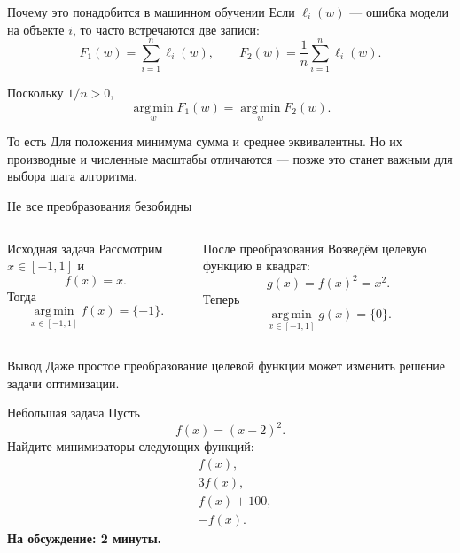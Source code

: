 \documentclass[aspectratio=169,10pt]{beamer}
\newcommand{\argmin}{\operatorname*{arg\,min}}
\newcommand{\loss}{\ell}
\begin{document}
\begin{frame}{Почему это понадобится в машинном обучении}
Если $\loss_i(w)$ --- ошибка модели на объекте $i$, то часто встречаются две записи:
\[
  F_1(w)=\sum_{i=1}^{n}\loss_i(w),
  \qquad
  F_2(w)=\frac{1}{n}\sum_{i=1}^{n}\loss_i(w).
\]

Поскольку $1/n>0$,
\[
  \boxed{\argmin_w F_1(w)=\argmin_w F_2(w).}
\]

\begin{block}{То есть}
Для положения минимума сумма и среднее эквивалентны. Но их производные и численные масштабы отличаются --- позже это станет важным для выбора шага алгоритма.
\end{block}
\end{frame}

\begin{frame}{Не все преобразования безобидны}
\vspace{0.45em}

\begin{columns}[T,onlytextwidth]
\begin{block}{Исходная задача}
Рассмотрим $x\in[-1,1]$ и
\[
f(x)=x.
\]
Тогда
\[
\argmin_{x\in[-1,1]} f(x)=\{-1\}.
\]
\end{block}

\begin{block}{После преобразования}
Возведём целевую функцию в квадрат:
\[
g(x)=f(x)^2=x^2.
\]
Теперь
\[
\argmin_{x\in[-1,1]} g(x)=\{0\}.
\]
\end{block}
\end{columns}

\vspace{0.6em}
\begin{alertblock}{Вывод}
Даже простое преобразование целевой функции может изменить решение задачи оптимизации.
\end{alertblock}
\end{frame}


\begin{frame}{Небольшая задача}
Пусть
\[
  f(x)=(x-2)^2.
\]
Найдите минимизаторы следующих функций:
\[
\begin{aligned}
  &f(x),\\[0.35em]
  &3f(x),\\[0.35em]
  &f(x)+100,\\[0.35em]
  &-f(x).
\end{aligned}
\]
\vfill
\centering
\textbf{На обсуждение: 2 минуты.}
\end{frame}
\end{document}
